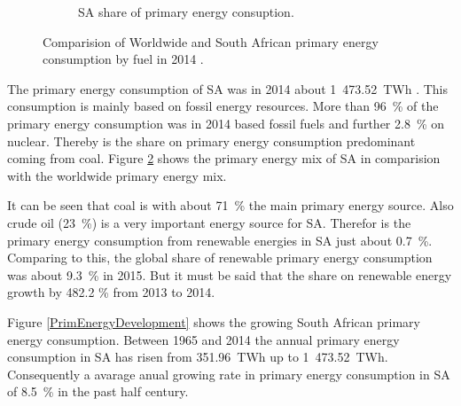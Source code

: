 \begin{figure}[!b]
\begin{subfigure}[b]{0.45\textwidth}
                \caption{SA share of primary energy consuption.}\label{PrimSA}
        \end{subfigure}
\caption[Comparision of Worldwide and South African primary energy consumption by fuel in 2014.]{Comparision of Worldwide and South African primary energy consumption by fuel in 2014 \cite{BP2015b}.}\label{PEKreis}
\end{figure}
The primary energy consumption of SA was in 2014 about 1~473.52~TWh \cite{BP2015b}. This consumption is mainly based on fossil energy resources. More than 96~\% of the primary energy consumption was in 2014 based fossil fuels and further 2.8~\% on nuclear. Thereby is the share on primary energy consumption predominant coming from coal. Figure \ref{PEKreis} shows the primary energy mix of SA in comparision with the worldwide primary energy mix. \cite{BP2015b}

It can be seen that coal is with about 71~\% the main primary energy source. Also crude oil (23~\%) is a very important energy source for SA. Therefor is the primary energy consumption from renewable energies in SA just about 0.7~\%. Comparing to this, the global share of  renewable primary energy consumption was about 9.3~\% in 2015. But it must be said that the share on renewable energy growth by 482.2 \% from 2013 to 2014. \cite{BP2015b}

Figure \ref{PrimEnergyDevelopment} shows the growing South African primary energy consumption. Between 1965 and 2014 the annual primary energy consumption in SA has risen from 351.96~TWh up to 1~473.52~TWh. Consequently a avarage anual growing rate in primary energy consumption in SA of 8.5~\% in the past half century. \cite{BP2015c}

